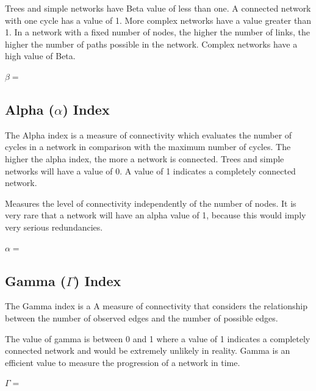         Trees and simple networks have Beta value of less than one. 
        A connected network with one cycle has a value of 1. 
        More complex networks have a value greater than 1. 
        In a network with a fixed number of nodes, the higher the 
        number of links, the higher the number of paths possible in 
        the network. Complex networks have a high value of Beta.
        
        $\beta = $
        \subsection{Alpha ($\alpha$) Index}
        The Alpha index is a measure of connectivity which evaluates
        the number of cycles in a network in comparison with the maximum 
        number of cycles. The higher the alpha index, the more a network 
        is connected. Trees and simple networks will have a value of 0. 
        A value of 1 indicates a completely connected network. 
        
        Measures the level of connectivity independently of the number of
        nodes. It is very rare that a network will have an alpha value of 1, 
        because this would imply very serious redundancies.
        
        $\alpha=$
        \subsection{Gamma ($\Gamma$) Index}
        The Gamma index is a A measure of connectivity that considers
        the relationship between the number of observed edges and the
        number of possible edges. 
        
        The value of gamma is between 0 and 1 where a value of 1 
        indicates a completely connected network and would be extremely 
        unlikely in reality. Gamma is an efficient value to measure 
        the progression of a network in time.
        
        $\Gamma=$

